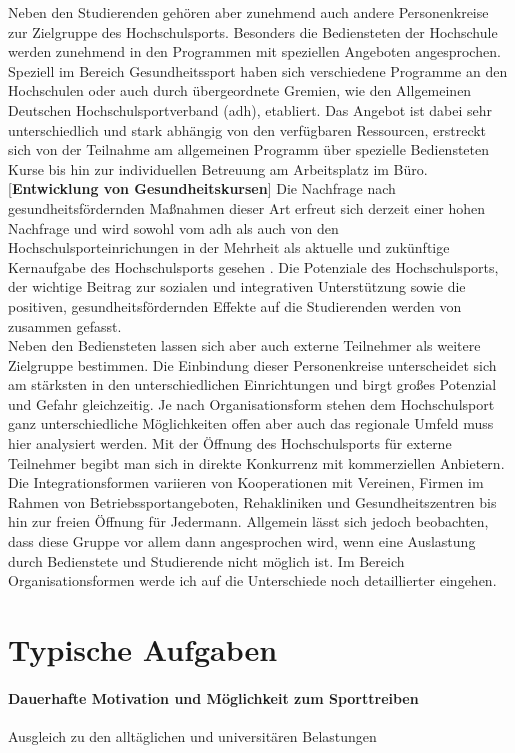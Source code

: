 Neben den Studierenden gehören aber zunehmend auch andere Personenkreise zur Zielgruppe des Hochschulsports. Besonders die Bediensteten der Hochschule werden zunehmend in den Programmen mit speziellen Angeboten angesprochen. Speziell im Bereich Gesundheitssport haben sich verschiedene Programme an den Hochschulen oder auch durch übergeordnete Gremien, wie den Allgemeinen Deutschen Hochschulsportverband (adh), etabliert. Das Angebot ist dabei sehr unterschiedlich und stark abhängig von den verfügbaren Ressourcen, erstreckt sich von der Teilnahme am allgemeinen Programm über spezielle Bediensteten Kurse bis hin zur individuellen Betreuung am Arbeitsplatz im Büro. [\textbf{Entwicklung von Gesundheitskursen}] Die Nachfrage nach gesundheitsfördernden Maßnahmen dieser Art erfreut sich derzeit einer hohen Nachfrage und wird sowohl vom adh als auch von den Hochschulsporteinrichungen in der Mehrheit als aktuelle und zukünftige Kernaufgabe des Hochschulsports gesehen \cite[vgl.][]{Baumgarten.2009}.
Die Potenziale des Hochschulsports, der wichtige Beitrag zur sozialen und integrativen Unterstützung sowie die positiven, gesundheitsfördernden Effekte auf die Studierenden werden von \cite{Goring.2010} zusammen gefasst. 
\\

Neben den Bediensteten lassen sich aber auch externe Teilnehmer als weitere Zielgruppe bestimmen. Die Einbindung dieser Personenkreise unterscheidet sich am stärksten in den unterschiedlichen Einrichtungen und birgt großes Potenzial und Gefahr gleichzeitig. Je nach Organisationsform stehen dem Hochschulsport ganz unterschiedliche Möglichkeiten offen aber auch das regionale Umfeld muss hier analysiert werden. Mit der Öffnung des Hochschulsports für externe Teilnehmer begibt man sich in direkte Konkurrenz mit kommerziellen Anbietern. Die Integrationsformen variieren von Kooperationen mit Vereinen, Firmen im Rahmen von Betriebssportangeboten, Rehakliniken und Gesundheitszentren bis hin zur freien Öffnung für Jedermann. Allgemein lässt sich jedoch beobachten, dass diese Gruppe vor allem dann angesprochen wird, wenn eine Auslastung durch Bedienstete und Studierende nicht möglich ist. Im Bereich Organisationsformen werde ich auf die Unterschiede noch detaillierter eingehen.  
\section{Typische Aufgaben}
\paragraph*{Dauerhafte Motivation und Möglichkeit zum Sporttreiben} Ausgleich zu den alltäglichen und universitären Belastungen
